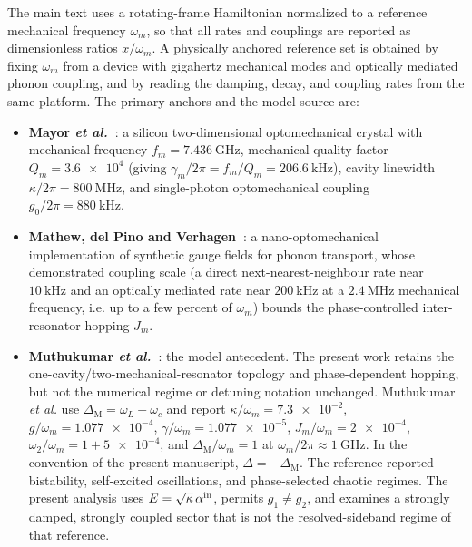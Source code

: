 \documentclass[Phys]{SciPost}
\begin{document}
The main text uses a rotating-frame Hamiltonian normalized to a reference
mechanical frequency $\omega_m$, so that all rates and couplings are reported as
dimensionless ratios $x/\omega_m$. A physically anchored reference set is obtained by
fixing $\omega_m$ from a device with gigahertz mechanical modes and optically mediated
phonon coupling, and by reading the damping, decay, and coupling rates from the same
platform. The primary anchors and the model source are:

\begin{itemize}
\item \textbf{Mayor \emph{et al.}~\cite{Mayor2025}}: a silicon two-dimensional optomechanical
crystal with mechanical frequency $f_m = \qty{7.436}{\giga\hertz}$, mechanical quality
factor $Q_m = \num{3.6e4}$ (giving $\gamma_m/2\pi = f_m/Q_m = \qty{206.6}{\kilo\hertz}$),
cavity linewidth $\kappa/2\pi = \qty{800}{\mega\hertz}$, and single-photon
optomechanical coupling $g_0/2\pi = \qty{880}{\kilo\hertz}$.
\item \textbf{Mathew, del Pino and Verhagen~\cite{Mathew2020}}: a nano-optomechanical
implementation of synthetic gauge fields for phonon transport, whose demonstrated
coupling scale (a direct next-nearest-neighbour rate near $\qty{10}{\kilo\hertz}$ and an
optically mediated rate near $\qty{200}{\kilo\hertz}$ at a $\qty{2.4}{\mega\hertz}$
mechanical frequency, i.e. up to a few percent of $\omega_m$) bounds the
phase-controlled inter-resonator hopping $J_m$.
\item \textbf{Muthukumar \emph{et al.}~\cite{muthukumar2025doi}}: the model antecedent. The
present work retains the one-cavity/two-mechanical-resonator topology and
phase-dependent hopping, but not the numerical regime or detuning notation
unchanged. Muthukumar \emph{et al.} use
$\Delta_{\mathrm M}=\omega_L-\omega_c$ and report
$\kappa/\omega_m=\num{7.3e-2}$, $g/\omega_m=\num{1.077e-4}$,
$\gamma/\omega_m=\num{1.077e-5}$, $J_m/\omega_m=\num{2e-4}$,
$\omega_2/\omega_m=1+\num{5e-4}$, and
$\Delta_{\mathrm M}/\omega_m=1$ at
$\omega_m/2\pi\approx\qty{1}{\giga\hertz}$. In the convention of the present
manuscript, $\Delta=-\Delta_{\mathrm M}$. The reference reported bistability,
self-excited oscillations, and phase-selected chaotic regimes. The present analysis
uses $E=\sqrt{\kappa}\,\alpha^{\rm in}$, permits $g_1\neq g_2$, and examines a
strongly damped, strongly coupled sector that is not the resolved-sideband regime
of that reference.
\end{itemize}
\end{document}
